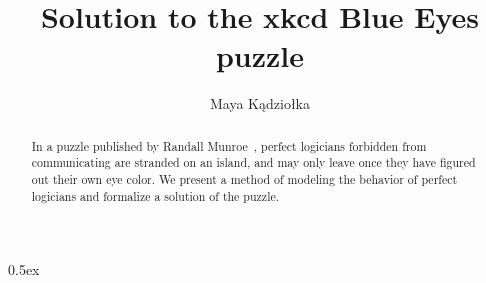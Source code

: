 \documentclass[11pt,a4paper]{article}
\begin{document}
\title{Solution to the xkcd Blue Eyes puzzle}
\author{Maya Kądziołka}
\maketitle

\begin{abstract}
    In a puzzle published by Randall Munroe~\cite{xkcd}, perfect logicians forbidden
    from communicating are stranded on an island, and may only leave once they
    have figured out their own eye color. We present a method of modeling the
    behavior of perfect logicians and formalize a solution of the puzzle.
\end{abstract}

\tableofcontents

\parindent 0pt\parskip 0.5ex





\end{document}
